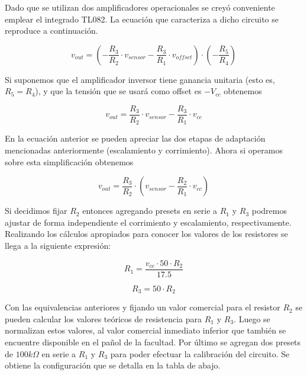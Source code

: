 Dado que se utilizan dos amplificadores operacionales se creyó conveniente emplear el integrado TL082. La ecuación que caracteriza a dicho circuito se reproduce a continuación.

\begin{equation}
    v_{out}= \left( - \frac{R_3}{R_2} \cdot v_{sensor}  - \frac{R_3}{R_1} \cdot v_{offset} \right) \cdot \left( -\frac{R_5}{R_4}   \right)
    \label{fig:EJ6_ecuacion_sistema} 
\end{equation}

Si suponemos que el amplificador inversor tiene ganancia unitaria (esto es, $R_5=R_4$), y que la tensión que se usará como offset es $-V_{cc}$ obtenemos

\begin{equation}
    v_{out}= \frac{R_3}{R_2} \cdot v_{sensor}  - \frac{R_3}{R_1} \cdot v_{cc} 
    \label{fig:EJ6_ecuacion_sistema2} 
\end{equation}

En la ecuación anterior se pueden apreciar las dos etapas de adaptación mencionadas anteriormente (escalamiento y corrimiento). Ahora si operamos sobre esta simplificación obtenemos

\begin{equation}
    v_{out}= \frac{R_3}{R_2} \cdot \left( v_{sensor} - \frac{R_2}{R_1} \cdot v_{cc} \right)
    \label{fig:EJ6_ecuacion_sistema_simplificada_final} 
\end{equation}

Si decidimos fijar $R_2$ entonces agregando presets en serie a $R_1$ y $R_3$ podremos ajustar de forma independiente el corrimiento y escalamiento, respectivamente.
Realizando los c\'alculos apropiados para conocer los valores de los resistores se llega a la siguiente expresi\'on:

\begin{equation}
    R_1 = \frac{v_{cc} \cdot 50 \cdot R_2}{17.5}
    \label{fig:EJ6_ecuacion_resistores}
\end{equation}

\begin{equation}
  R_3 = 50 \cdot R_2
  \label{fig:EJ6_ecuacion_resistores2}
\end{equation}

Con las equivalencias anteriores y fijando un valor comercial para el resistor $R_2$ se pueden calcular los valores teóricos de resistencia para $R_1$ y $R_3$.
  Luego se normalizan estos valores, al valor comercial inmediato inferior que tambi\'en se encuentre disponible en el pa\~nol de la facultad.
  Por \'ultimo se agregan dos presets de $100k\Omega$ en serie a $R_1$ y $R_3$ para poder efectuar la calibraci\'on del circuito. Se obtiene la configuraci\'on que se detalla en la tabla de abajo.

